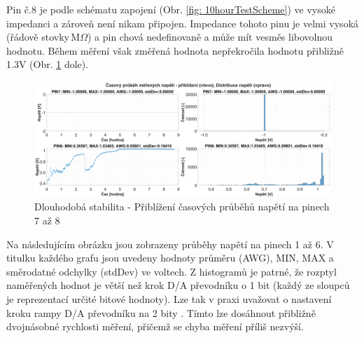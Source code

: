 Pin č.8 je podle schématu zapojení (Obr. \ref{fig: 10hourTestScheme}) ve vysoké impedanci a zároveň není nikam připojen.
Impedance tohoto pinu je velmi vysoká (řádově stovky\,M$\Omega$) a pin chová nedefinovaně a může mít vesměs libovolnou hodnotu.
Během měření však změřená hodnota nepřekročila hodnotu přibližně 1.3V (Obr. \ref{fig: 10hourTest Voltage PINS7TO8} dole).
\begin{figure}[ht!]
    \centering
    \includegraphics[width = 1\textwidth]{obrazky/matlab_generated/VOLTAGE_TESTER/dlouhodoba_stabilita_voltage_part2.eps}
    \caption{Dlouhodobá stabilita - Přiblížení časových průběhů napětí na pinech 7 až 8}
    \label{fig: 10hourTest Voltage PINS7TO8}
\end{figure}

\clearpage
Na následujícím obrázku jsou zobrazeny průběhy napětí na pinech 1 až 6.
V titulku každého grafu jsou uvedeny hodnoty průměru (AWG), MIN, MAX a směrodatné odchylky (stdDev) ve voltech.
Z histogramů je patrné, že rozptyl naměřených hodnot je větší než krok D/A převodníku o 1 bit
(každý ze sloupců je reprezentací určité bitové hodnoty). Lze tak v praxi uvažovat o nastavení kroku rampy
D/A převodníku na 2 bity . Tímto lze dosáhnout přibližně dvojnásobné rychlosti měření, přičemž se chyba měření příliš nezvýší.\\

